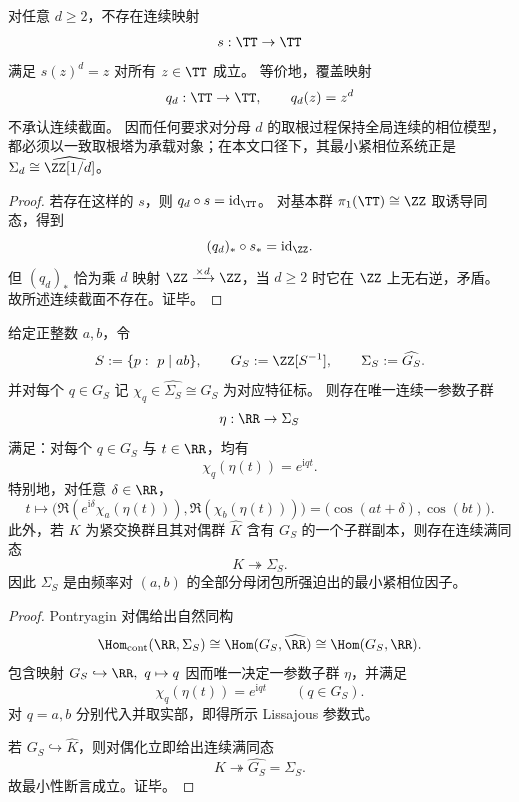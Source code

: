 \begin{proposition}[幂覆盖不承认全局连续开方截面]\label{prop:cdim-circle-power-no-continuous-section}
对任意 \(d\ge 2\)，不存在连续映射
\[
s:\TT\to\TT
\]
满足 \(s(z)^d=z\) 对所有 \(z\in\TT\) 成立。
等价地，覆盖映射
\[
q_d:\TT\to\TT,
\qquad
q_d(z)=z^d
\]
不承认连续截面。
因而任何要求对分母 \(d\) 的取根过程保持全局连续的相位模型，都必须以一致取根塔为承载对象；在本文口径下，其最小紧相位系统正是 \(\Sigma_d\cong\widehat{\ZZ[1/d]}\)。
\end{proposition}
\begin{proof}
若存在这样的 \(s\)，则 \(q_d\circ s=\mathrm{id}_{\TT}\)。
对基本群 \(\pi_1(\TT)\cong\ZZ\) 取诱导同态，得到
\[
(q_d)_*\circ s_*=\mathrm{id}_{\ZZ}.
\]
但 \((q_d)_*\) 恰为乘 \(d\) 映射 \(\ZZ\xrightarrow{\times d}\ZZ\)，当 \(d\ge 2\) 时它在 \(\ZZ\) 上无右逆，矛盾。
故所述连续截面不存在。证毕。
\end{proof}

\begin{theorem}\label{thm:cdim-lissajous-minimal-solenoid-factor}
给定正整数 \(a,b\)，令
\[
S:=\{p:\ p\mid ab\},
\qquad
G_S:=\ZZ[S^{-1}],
\qquad
\Sigma_S:=\widehat{G_S}.
\]
并对每个 \(q\in G_S\) 记 \(\chi_q\in\widehat{\Sigma_S}\cong G_S\) 为对应特征标。
则存在唯一连续一参数子群
\[
\eta:\RR\to\Sigma_S
\]
满足：对每个 \(q\in G_S\) 与 \(t\in\RR\)，均有
\[
\boxed{\;
\chi_q(\eta(t))=e^{\mathrm{i}qt}.\;}
\]
特别地，对任意 \(\delta\in\RR\)，
\[
\boxed{\;
t\longmapsto
\bigl(\Re(e^{\mathrm{i}\delta}\chi_a(\eta(t))),\Re(\chi_b(\eta(t)))\bigr)
=
\bigl(\cos(at+\delta),\cos(bt)\bigr).\;}
\]
此外，若 \(K\) 为紧交换群且其对偶群 \(\widehat K\) 含有 \(G_S\) 的一个子群副本，则存在连续满同态
\[
K\twoheadrightarrow \Sigma_S.
\]
因此 \(\Sigma_S\) 是由频率对 \((a,b)\) 的全部分母闭包所强迫出的最小紧相位因子。
\end{theorem}
\begin{proof}
Pontryagin 对偶给出自然同构
\[
\Hom_{\mathrm{cont}}(\RR,\Sigma_S)
\cong
\Hom(G_S,\widehat{\RR})
\cong
\Hom(G_S,\RR).
\]
包含映射 \(G_S\hookrightarrow\RR,\ q\mapsto q\) 因而唯一决定一参数子群 \(\eta\)，并满足
\[
\chi_q(\eta(t))=e^{\mathrm{i}qt}
\qquad(q\in G_S).
\]
对 \(q=a,b\) 分别代入并取实部，即得所示 Lissajous 参数式。

若 \(G_S\hookrightarrow\widehat K\)，则对偶化立即给出连续满同态
\[
K\twoheadrightarrow \widehat{G_S}=\Sigma_S.
\]
故最小性断言成立。证毕。
\end{proof}

